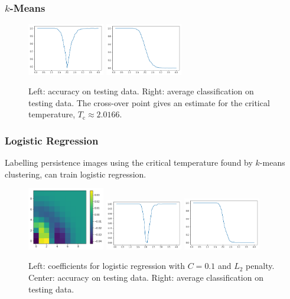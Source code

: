\documentclass[11pt]{article}
\begin{document}
\newpage
\subsubsection{$k$-Means}

\begin{figure}[h]
	\centering
	\includegraphics[width=0.3\textwidth]{squareice_images/kmeans_2d_squareice}
	\includegraphics[width=0.3\textwidth]{squareice_images/kmeans_avg_2d_squareice}
	\caption{Left: accuracy on testing data. Right: average classification on testing data. The cross-over point gives an estimate for the critical temperature, $T_\text{c}\approx 2.0166$.}
\end{figure}


\subsubsection{Logistic Regression}
Labelling persistence images using the critical temperature found by $k$-means clustering, can train logistic regression.

\begin{figure}[h]
    \centering
    \includegraphics[width=0.3\textwidth]{squareice_images/logreg_2d_squareice}
    \includegraphics[width=0.3\textwidth]{squareice_images/logreg_acc_2d_squareice}
    \includegraphics[width=0.3\textwidth]{squareice_images/logreg_avg_2d_squareice}
    \caption{Left: coefficients for logistic regression with $C=0.1$ and $L_2$ penalty. Center: accuracy on testing data. Right: average classification on testing data.}
    \label{fig:SquareiceLogReg}
\end{figure}
\end{document}
